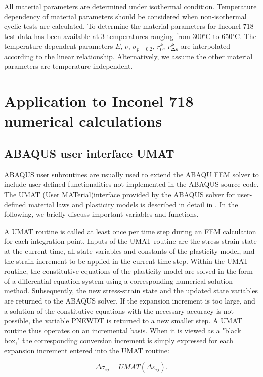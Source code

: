 All material parameters are determined under isothermal condition.
Temperature dependency of material parameters should be considered when non-isothermal cyclic tests are calculated.
To determine the material parameters for Inconel 718 test data has been available at 3 temperatures ranging from 300$^{\circ}$C to 650$^{\circ}$C.
The temperature dependent parameters $E$, $\nu$, $\sigma_{p=0.2}$, $r_0^k$, $r_{\Delta \rm{s}}^k$ are interpolated according to the linear relationship.
Alternatively, we assume the other material parameters are temperature independent.

\section{Application to Inconel 718 numerical calculations}

\subsection{ABAQUS user interface UMAT}
ABAQUS user subroutines are usually used to extend the ABAQU FEM solver to include user-defined functionalities not implemented in the ABAQUS source code.
The UMAT (User MATerial)interface provided by the ABAQUS solver for user-defined material laws and plasticity models is described in detail in \cite{abaqus20106}. In the following, we briefly discuss important variables and functions.

A UMAT routine is called at least once per time step during an FEM calculation for each integration point.
Inputs of the UMAT routine are the stress-strain state at the current time, all state variables and constants of the plasticity model, and the strain increment to be applied in the current time step.
Within the UMAT routine, the constitutive equations of the plasticity model are solved in the form of a differential equation system using a corresponding numerical solution method.
Subsequently, the new stress-strain state and the updated state variables are returned to the ABAQUS solver.
If the expansion increment is too large, and a solution of the constitutive equations with the necessary accuracy is not possible, the variable PNEWDT is returned to a new smaller step.
A UMAT routine thus operates on an incremental basis.
When it is viewed as a "black box," the corresponding conversion increment is simply expressed for each expansion increment entered into the UMAT routine:

\begin{equation}
\Delta \sigma_{ij}=UMAT(\Delta \varepsilon_{ij}).
\end{equation}

